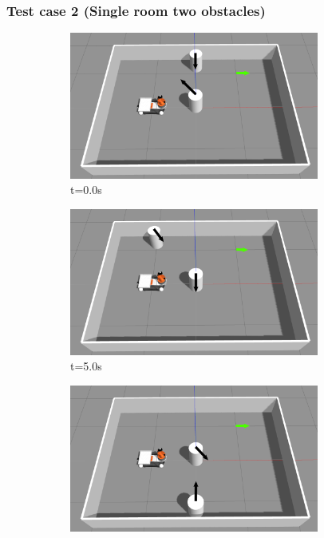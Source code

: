\documentclass{beamer}
\begin{document}
\begin{frame}
    \frametitle{\huge{Test case 2} (Single room two obstacles)}
    \begin{figure}[H]
        \centering
        \begin{subfigure}[b]{0.50\linewidth}
            \centering
            \includegraphics[width=0.90\textwidth]{../report/images/test_case_2/exp1.png}
            \caption{t=0.0s}
        \end{subfigure}%
        \begin{subfigure}[b]{0.50\linewidth}
            \centering
            \includegraphics[width=0.90\textwidth]{../report/images/test_case_2/exp2.png}
            \caption{t=5.0s}
        \end{subfigure}
        \begin{subfigure}[b]{0.50\linewidth}
            \centering
            \includegraphics[width=0.90\textwidth]{../report/images/test_case_2/exp3.png}

\end{subfigure}
\end{figure}
\end{frame}
\end{document}
